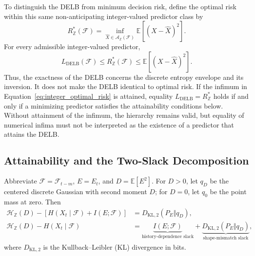 To distinguish the DELB from minimum decision risk, define the optimal risk
within this same non-anticipating integer-valued predictor class by
\begin{equation}
R_{\mathbb Z}^{*}(\mathcal F)
=
\inf_{\widehat X\in\mathcal A_{\mathbb Z}(\mathcal F)}
\mathbb E[(X-\widehat X)^2].
\label{eq:integer_optimal_risk}
\end{equation}
For every admissible integer-valued predictor,
\begin{equation}
L_{\mathrm{DELB}}(\mathcal F)
\leq
R_{\mathbb Z}^{*}(\mathcal F)
\leq
\mathbb E[(X-\widehat X)^2].
\label{eq:delb_bayes_risk_hierarchy}
\end{equation}
Thus, the exactness of the DELB concerns the discrete entropy envelope and
its inversion. It does not make the DELB identical to optimal risk. If the
infimum in Equation~\eqref{eq:integer_optimal_risk} is attained, equality
\(L_{\mathrm{DELB}}=R_{\mathbb Z}^{*}\) holds if and only if a minimizing
predictor satisfies the attainability conditions below. Without attainment
of the infimum, the hierarchy remains valid, but equality of numerical
infima must not be interpreted as the existence of a predictor that attains
the DELB.

\subsection{Attainability and the Two-Slack Decomposition}
\label{subsec:attainability}

\begin{Proposition}
\label{prop:attainability_decomposition}
Abbreviate \(\mathcal F=\mathcal F_{t-m}\), \(E=E_t\), and
\(D=\mathbb E[E^2]\). For \(D>0\), let \(q_D\) be the centered discrete
Gaussian with second moment \(D\); for \(D=0\), let \(q_0\) be the point mass
at zero. Then
\begin{align}
\mathcal H_{\mathbb Z}(D)
-\left[H(X_t\mid\mathcal F)+I(E;\mathcal F)\right]
&=
D_{\mathrm{KL},2}(P_E\Vert q_D),
\label{eq:predictor_attainability_decomposition}\\
\mathcal H_{\mathbb Z}(D)-H(X_t\mid\mathcal F)
&=
\underbrace{I(E;\mathcal F)}_{\text{history-dependence slack}}
+
\underbrace{D_{\mathrm{KL},2}(P_E\Vert q_D)}_
{\text{shape-mismatch slack}},
\label{eq:universal_attainability_decomposition}
\end{align}
where \(D_{\mathrm{KL},2}\) is the Kullback--Leibler (KL) divergence in bits.
\end{Proposition}

